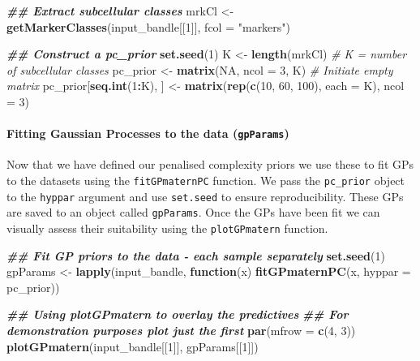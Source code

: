 \documentclass[9pt,a4paper,]{extarticle}
\newenvironment{Shaded}{\begin{snugshade}}{\end{snugshade}}
\newcommand{\AttributeTok}[1]{\textcolor[rgb]{0.13,0.29,0.53}{#1}}
\newcommand{\CommentTok}[1]{\textcolor[rgb]{0.56,0.35,0.01}{\textit{#1}}}
\newcommand{\ConstantTok}[1]{\textcolor[rgb]{0.56,0.35,0.01}{#1}}
\newcommand{\ControlFlowTok}[1]{\textcolor[rgb]{0.13,0.29,0.53}{\textbf{#1}}}
\newcommand{\DecValTok}[1]{\textcolor[rgb]{0.00,0.00,0.81}{#1}}
\newcommand{\DocumentationTok}[1]{\textcolor[rgb]{0.56,0.35,0.01}{\textbf{\textit{#1}}}}
\newcommand{\FunctionTok}[1]{\textcolor[rgb]{0.13,0.29,0.53}{\textbf{#1}}}
\newcommand{\NormalTok}[1]{#1}
\newcommand{\OtherTok}[1]{\textcolor[rgb]{0.56,0.35,0.01}{#1}}
\newcommand{\SpecialCharTok}[1]{\textcolor[rgb]{0.81,0.36,0.00}{\textbf{#1}}}
\newcommand{\StringTok}[1]{\textcolor[rgb]{0.31,0.60,0.02}{#1}}
\begin{document}
\begin{Shaded}
\begin{Highlighting}[]
\DocumentationTok{\#\# Extract subcellular classes}
\NormalTok{mrkCl }\OtherTok{\textless{}{-}} \FunctionTok{getMarkerClasses}\NormalTok{(input\_bandle[[}\DecValTok{1}\NormalTok{]], }\AttributeTok{fcol =} \StringTok{"markers"}\NormalTok{)}

\DocumentationTok{\#\# Construct a pc\_prior}
\FunctionTok{set.seed}\NormalTok{(}\DecValTok{1}\NormalTok{)}
\NormalTok{K }\OtherTok{\textless{}{-}} \FunctionTok{length}\NormalTok{(mrkCl) }\CommentTok{\# K = number of subcellular classes}
\NormalTok{pc\_prior }\OtherTok{\textless{}{-}} \FunctionTok{matrix}\NormalTok{(}\ConstantTok{NA}\NormalTok{, }\AttributeTok{ncol =} \DecValTok{3}\NormalTok{, K) }\CommentTok{\# Initiate empty matrix}
\NormalTok{pc\_prior[}\FunctionTok{seq.int}\NormalTok{(}\DecValTok{1}\SpecialCharTok{:}\NormalTok{K), ] }\OtherTok{\textless{}{-}} \FunctionTok{matrix}\NormalTok{(}\FunctionTok{rep}\NormalTok{(}\FunctionTok{c}\NormalTok{(}\DecValTok{10}\NormalTok{, }\DecValTok{60}\NormalTok{, }\DecValTok{100}\NormalTok{), }\AttributeTok{each =}\NormalTok{ K), }\AttributeTok{ncol =} \DecValTok{3}\NormalTok{) }
\end{Highlighting}
\end{Shaded}

\paragraph{\texorpdfstring{Fitting Gaussian Processes to the data (\texttt{gpParams})}{Fitting Gaussian Processes to the data (gpParams)}}\label{fitting-gaussian-processes-to-the-data-gpparams}

Now that we have defined our penalised complexity priors we use these to fit
GPs to the datasets using the \texttt{fitGPmaternPC} function. We pass the \texttt{pc\_prior}
object to the \texttt{hyppar} argument and use \texttt{set.seed} to ensure reproducibility.
These GPs are saved to an object called \texttt{gpParams}. Once the GPs have been fit
we can visually assess their suitability using the \texttt{plotGPmatern} function.

\begin{Shaded}
\begin{Highlighting}[]
\DocumentationTok{\#\# Fit GP priors to the data {-} each sample separately}
\FunctionTok{set.seed}\NormalTok{(}\DecValTok{1}\NormalTok{)}
\NormalTok{gpParams }\OtherTok{\textless{}{-}} \FunctionTok{lapply}\NormalTok{(input\_bandle,}
                   \ControlFlowTok{function}\NormalTok{(x) }\FunctionTok{fitGPmaternPC}\NormalTok{(x, }\AttributeTok{hyppar =}\NormalTok{ pc\_prior))}

\DocumentationTok{\#\# Using plotGPmatern to overlay the predictives}
\DocumentationTok{\#\# For demonstration purposes plot just the first}
\FunctionTok{par}\NormalTok{(}\AttributeTok{mfrow =} \FunctionTok{c}\NormalTok{(}\DecValTok{4}\NormalTok{, }\DecValTok{3}\NormalTok{))}
\FunctionTok{plotGPmatern}\NormalTok{(input\_bandle[[}\DecValTok{1}\NormalTok{]], gpParams[[}\DecValTok{1}\NormalTok{]])}
\end{Highlighting}
\end{Shaded}
\end{document}
